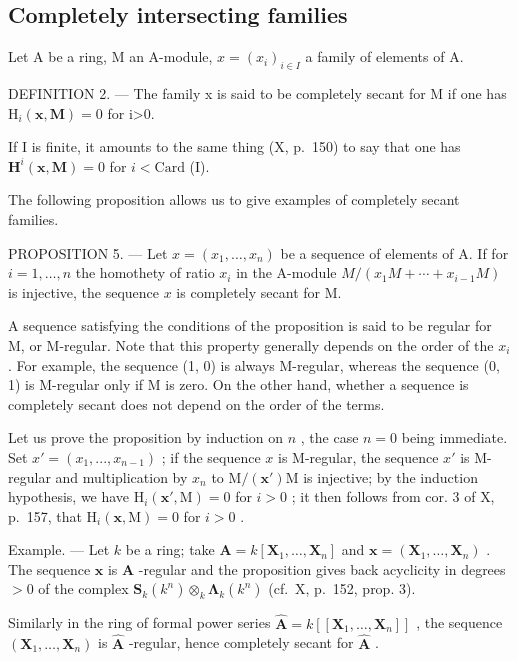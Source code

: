 \subsection{Completely intersecting families}

Let A be a ring, M an A-module, \(x = (x_{i})_{i \in I}\) a family of elements of A.

DEFINITION 2. --- The family x is said to be completely secant for M if one has \(\mathrm{H}_{i}(\mathbf{x},\mathbf{M})=0\) for i\textgreater0.

If I is finite, it amounts to the same thing (X, p.~150) to say that one has \(\mathbf{H}^i (\pmb {x},\mathbf{M}) = 0\) for \(i <   \mathrm{Card}\) (I).

The following proposition allows us to give examples of completely secant families.

PROPOSITION 5. — Let \(x = (x_1, \ldots, x_n)\) be a sequence of elements of A. If for \(i=1, \ldots, n\) the homothety of ratio \(x_i\) in the A-module \(M/(x_1 M + \cdots + x_{i-1} M)\) is injective, the sequence \(x\) is completely secant for M.

A sequence satisfying the conditions of the proposition is said to be regular for M, or M-regular. Note that this property generally depends on the order of the \(x_i\) . For example, the sequence (1, 0) is always M-regular, whereas the sequence (0, 1) is M-regular only if M is zero. On the other hand, whether a sequence is completely secant does not depend on the order of the terms.

Let us prove the proposition by induction on \(n\) , the case \(n=0\) being immediate. Set \(x'=(x_{1},...,x_{n-1})\) ; if the sequence \(x\) is M-regular, the sequence \(x'\) is M-regular and multiplication by \(x_{n}\) to \(\mathrm{M}/(\mathbf{x}')\mathrm{M}\) is injective; by the induction hypothesis, we have \(\mathrm{H}_{i}(\mathbf{x}',\mathrm{M})=0\) for \(i>0\) ; it then follows from cor. 3 of X, p.~157, that \(\mathrm{H}_{i}(\mathbf{x},\mathrm{M})=0\) for \(i>0\) .

Example. --- Let \(k\) be a ring; take \(\mathbf{A} = k[\mathbf{X}_1, \ldots, \mathbf{X}_n]\) and \(\boldsymbol{x} = (\mathbf{X}_1, \ldots, \mathbf{X}_n)\) . The sequence \(\boldsymbol{x}\) is \(\mathbf{A}\) -regular and the proposition gives back acyclicity in degrees \(>0\) of the complex \(\mathbf{S}_k(k^n) \otimes_k \boldsymbol{\Lambda}_k(k^n)\) (cf.~X, p.~152, prop. 3).

Similarly in the ring of formal power series \(\hat{\mathbf{A}} = k[[\mathbf{X}_1, \ldots, \mathbf{X}_n]]\) , the sequence \((\mathbf{X}_1, \ldots, \mathbf{X}_n)\) is \(\hat{\mathbf{A}}\) -regular, hence completely secant for \(\hat{\mathbf{A}}\) .

